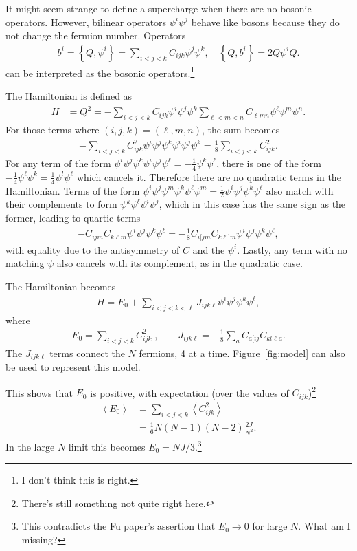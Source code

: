 \documentclass[12pt]{article} %
\renewcommand{\th}[1]{\frac{1}{#1}}
\newcommand{\ex}[1]{\left\langle #1 \right\rangle}
\renewcommand{\l}{\ell}
\newcommand{\acom}[2]{\left\{#1,#2\right\}}
\newcommand{\nn}{\nonumber\\}
\begin{document}
It might seem strange to define a supercharge when there are no bosonic operators. However, bilinear operators $\psi^i\psi^j$ behave like bosons because they do not change the fermion number. Operators 
\begin{align}
b^i = \acom{Q}{\psi^i} = \sum_{i<j<k}C_{ijk}\psi^j\psi^k, \quad \acom{Q}{b^i} 
	= 2Q\psi^iQ \label{eqn:N1bosons}.
\end{align}
can be interpreted as the bosonic operators.\footnote{I don't think this is right.}

The Hamiltonian is defined as
\begin{align}
H &= Q^2 = - \sum_{i<j<k}C_{ijk}\psi^i\psi^j\psi^k\sum_{\l<m<n}C_{\l mn}\psi^\l
	\psi^m\psi^n.
\end{align}
For those terms where $(i,j,k) = (\l,m,n)$, the sum becomes
\begin{align}
-\sum_{i<j<k} C_{ijk}^2 \psi^i\psi^j\psi^k \psi^i\psi^j\psi^k = \th{8} 
	\sum_{i<j<k}C_{ijk}^2.
\end{align}
For any term of the form $\psi^i\psi^j\psi^k\psi^i\psi^j\psi^\l = -\th{4}\psi^k\psi^\l$, there is one of the form $-\th{4}\psi^\l\psi^k=\th{4}\psi^l\psi^\l$ which cancels it. Therefore there are no quadratic terms in the Hamiltonian. Terms of the form $\psi^i\psi^j\psi^m\psi^k\psi^\l\psi^m = \th{2}\psi^i\psi^j\psi^k\psi^\l$ also match with their complements to form $\psi^k\psi^\l\psi^i\psi^j$, which in this case has the same sign as the former, leading to quartic terms
\begin{align}
-C_{ijm}C_{k\l m}\psi^i\psi^j\psi^k\psi^\l = -\th{8}C_{i[jm}C_{k\l]m} \psi^i \psi^j \psi^k\psi^\l,
\end{align}
with equality due to the antisymmetry of $C$ and the $\psi^i$. Lastly, any term with no matching $\psi$ also cancels with its complement, as in the quadratic case.

The Hamiltonian becomes
\begin{align}
H = E_0 + \sum_{i<j<k<\l}J_{ijk\l}\psi^i\psi^j\psi^k\psi^\l, \label{eqn:N1def}
\end{align}
where
\begin{align}
E_0 = \sum_{i<j<k} C_{ijk}^2\;,\qquad J_{ijk\l} = -\th{8}\sum_{a} C_{a[ij}
	C_{kl\l a}.
\end{align}
The $J_{ijk\l}$ terms connect the $N$ fermions, 4 at a time. Figure~\ref{fig:model} can also be used to represent this model.

This shows that $E_0$ is positive, with expectation (over the values of $C_{ijk}$)\footnote{There's still something not quite right here.}
\begin{align}
\ex{E_0} &= \sum_{i<j<k}\ex{C^2_{ijk}}\nn
&= \th{6}N(N-1)(N-2)\frac{2J}{N^2}.
\end{align}
In the large $N$ limit this becomes $E_0 = NJ/3$.\footnote{This contradicts the Fu paper's assertion that $E_0\to 0$ for large $N$. What am I missing?}
\end{document}
